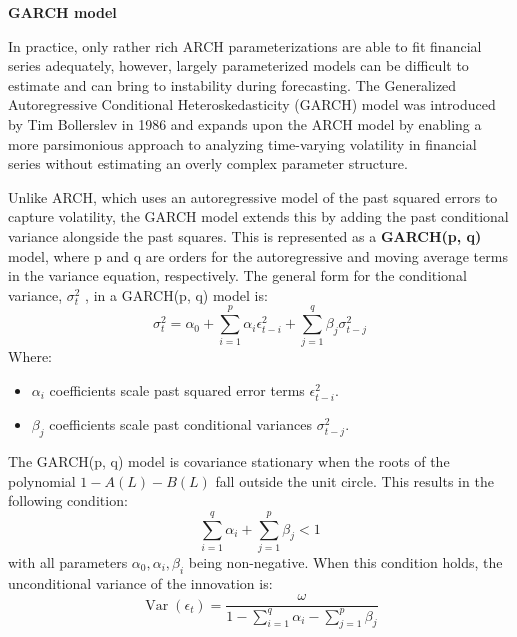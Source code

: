 \textbf{GARCH model}

In practice, only rather rich ARCH parameterizations are able to fit financial series adequately, however, largely parameterized models can be difficult to estimate and can bring to instability during forecasting. The Generalized Autoregressive Conditional Heteroskedasticity (GARCH) model was introduced by Tim Bollerslev in 1986 \cite{Bollerslev1986} and expands upon the ARCH model by enabling a more parsimonious approach to analyzing time-varying volatility in financial series without estimating an overly complex parameter structure. 

Unlike ARCH, which uses an autoregressive model of the past squared errors to capture volatility, the GARCH model extends this by adding the past conditional variance alongside the past squares. This is represented as a \textbf{GARCH(p, q)} model, where p and q are orders for the autoregressive and moving average terms in the variance equation, respectively. The general form for the conditional variance, \(\sigma _{t}^{2}\) , in a GARCH(p, q) model is:
\begin{equation}
\sigma_{t}^{2} = \alpha_{0} + \sum_{i=1}^{p} \alpha_{i} \epsilon_{t-i}^{2} + \sum_{j=1}^{q} \beta_{j} \sigma_{t-j}^{2}
\end{equation} 
Where: 
\begin{itemize}
    \item $\alpha_{i}$ coefficients scale past squared error terms $\epsilon_{t-i}^{2}$.
    \item $\beta_{j}$ coefficients scale past conditional variances $\sigma_{t-j}^{2}$.
\end{itemize}

The GARCH(p, q) model is covariance stationary when the roots of the polynomial \(1 - A(L) - B(L)\) fall outside the unit circle. This results in the following condition: 
\begin{equation}
\sum_{i=1}^{q} \alpha_{i} + \sum_{j=1}^{p} \beta_{j} < 1
\end{equation} 
with all parameters \(\alpha_{0}, \alpha_{i}, \beta_{i}\) being non-negative. When this condition holds, the unconditional variance of the innovation is: 
\begin{equation}
\operatorname{Var}(\epsilon_{t}) = \frac{\omega}{1 - \sum_{i=1}^{q} \alpha_{i} - \sum_{j=1}^{p} \beta_{j}}
\end{equation}


